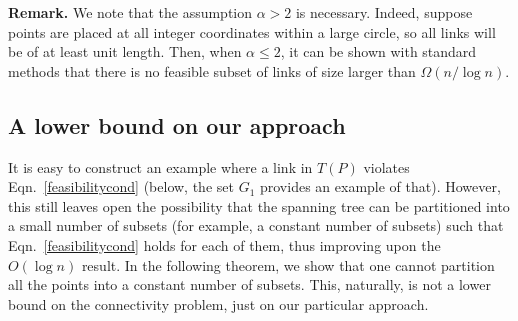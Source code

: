 \documentclass[11pt]{amsart}
\begin{document}
\smallskip
\noindent
\textbf{Remark.} We note that the assumption $\alpha > 2$ is necessary.
Indeed, suppose points are placed at all integer coordinates within a
large circle, so all links will be of at least unit length.
Then, when $\alpha \le 2$, it can be shown with standard methods that 
there is no feasible subset of links of size larger than $\Omega(n/\log n)$.


\subsection{A lower bound on our approach}
It is easy to construct an example where a link in $T(P)$ violates
Eqn.~\ref{feasibilitycond} (below, the set $G_1$ provides an example of that). However,
this still leaves open the possibility that the spanning tree can be partitioned into a small number
 of subsets (for example, a constant number of subsets) such that Eqn.~\ref{feasibilitycond} holds
for each of them, thus improving upon the $O(\log n)$ result. In the following theorem, we show that one
cannot partition all the points into a constant number of subsets. This, naturally, is not a lower bound
on the connectivity problem, just on our particular approach.
\end{document}
